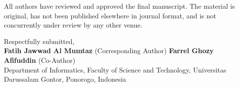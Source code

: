 \documentclass[10pt,a4paper]{article}
\begin{document}
All authors have reviewed and approved the final manuscript. The material is original, has not been published elsewhere in journal format, and is not concurrently under review by any other venue.

\vspace{0.4em}
\noindent Respectfully submitted,\\
\textbf{Fatih Jawwad Al Mumtaz} (Corresponding Author) \quad \textbf{Farrel Ghozy Afifuddin} (Co-Author)\\
Department of Informatics, Faculty of Science and Technology, Universitas Darussalam Gontor, Ponorogo, Indonesia
\end{document}
